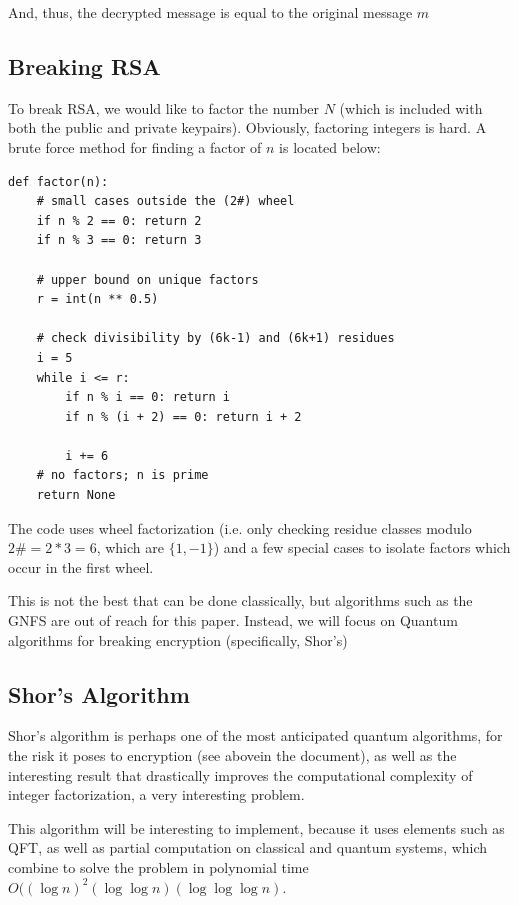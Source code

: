 \documentclass[a4paper,11pt]{article}
\theoremstyle{mytheor}
\begin{document}
And, thus, the decrypted message is equal to the original message $m$

\subsection{Breaking RSA}

To break RSA, we would like to factor the number $N$ (which is included with both the public and private keypairs). Obviously, factoring integers is hard. A brute force method for finding a factor of $n$ is located below:

\begin{lstlisting}
def factor(n):
    # small cases outside the (2#) wheel
    if n % 2 == 0: return 2
    if n % 3 == 0: return 3
    
    # upper bound on unique factors
    r = int(n ** 0.5)
    
    # check divisibility by (6k-1) and (6k+1) residues
    i = 5
    while i <= r:
        if n % i == 0: return i
        if n % (i + 2) == 0: return i + 2
        
        i += 6
    # no factors; n is prime
    return None
\end{lstlisting}


The code uses wheel factorization (i.e. only checking residue classes modulo $2\#=2*3=6$, which are $\{1, -1\}$) and a few special cases to isolate factors which occur in the first wheel.

This is not the best that can be done classically, but algorithms such as the GNFS are out of reach for this paper. Instead, we will focus on Quantum algorithms for breaking encryption (specifically, Shor's)

\subsection{Shor's Algorithm}

Shor's algorithm is perhaps one of the most anticipated quantum algorithms, for the risk it poses to encryption (see abovein the document), as well as the interesting result that drastically improves the computational complexity of integer factorization, a very interesting problem.

This algorithm will be interesting to implement, because it uses elements such as QFT, as well as partial computation on classical and quantum systems, which combine to solve the problem in polynomial time $O((\log n)^2(\log \log n)(\log \log \log n)$.
\end{document}
